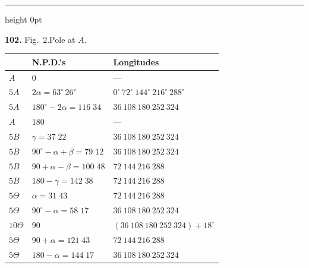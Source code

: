 \documentclass[11pt,a4paper]{article}
\newcommand{\artno}[1]{\textbf{#1.}\quad}
\begin{document}
\bigskip
\hrule height 0pt
\bigskip

\artno{102} Fig.~2.\quad Pole at $A$.
\begin{center}
\end{center}

\begin{center}
\small
\begin{tabular}{l@{\qquad}l@{\qquad}l}
 & N.P.D.'s & Longitudes\\\hline
$A$         & $0$                                  & ---\\
$5A$        & $2\alpha = 63^{\circ}\,26'$           & $0^{\circ}\ 72^{\circ}\ 144^{\circ}\ 216^{\circ}\ 288^{\circ}$\\
$5A$        & $180^{\circ} - 2\alpha = 116\;34$     & $36\ 108\ 180\ 252\ 324$\\
$A$         & $180$                                & ---\\
$5B$        & $\gamma = 37\;22$                     & $36\ 108\ 180\ 252\ 324$\\
$5B$        & $90^{\circ} - \alpha + \beta = 79\;12$ & $36\ 108\ 180\ 252\ 324$\\
$5B$        & $90 + \alpha - \beta = 100\;48$       & $72\ 144\ 216\ 288$\\
$5B$        & $180 - \gamma = 142\;38$              & $72\ 144\ 216\ 288$\\
$5\Theta$   & $\alpha = 31\;43$                     & $72\ 144\ 216\ 288$\\
$5\Theta$   & $90^{\circ} - \alpha = 58\;17$         & $36\ 108\ 180\ 252\ 324$\\
$10\Theta$  & $90$                                 & $(36\ 108\ 180\ 252\ 324) + 18^{\circ}$\\
$5\Theta$   & $90 + \alpha = 121\;43$               & $72\ 144\ 216\ 288$\\
$5\Theta$   & $180 - \alpha = 144\;17$              & $36\ 108\ 180\ 252\ 324$\\
\end{tabular}
\end{center}
\normalsize
\end{document}
